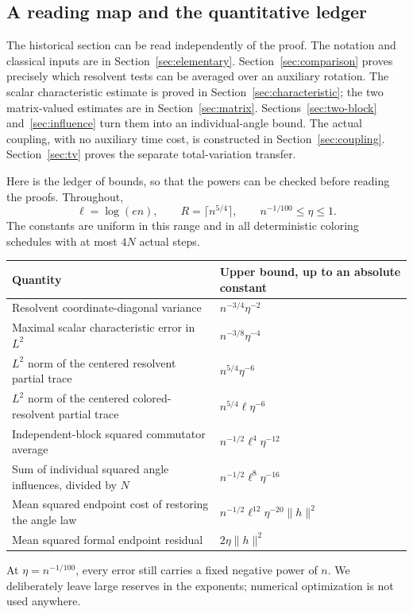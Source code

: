 \documentclass[11pt]{article}
\theoremstyle{definition}\newtheorem{definition}[theorem]{Definition}
\theoremstyle{remark}\newtheorem{remark}[theorem]{Remark}
\begin{document}
\subsection{A reading map and the quantitative ledger}
The historical section can be read independently of the proof. The notation and classical inputs are in Section~\ref{sec:elementary}. Section~\ref{sec:comparison} proves precisely which resolvent tests can be averaged over an auxiliary rotation. The scalar characteristic estimate is proved in Section~\ref{sec:characteristic}; the two matrix-valued estimates are in Section~\ref{sec:matrix}. Sections~\ref{sec:two-block} and~\ref{sec:influence} turn them into an individual-angle bound. The actual coupling, with no auxiliary time cost, is constructed in Section~\ref{sec:coupling}. Section~\ref{sec:tv} proves the separate total-variation transfer.

Here is the ledger of bounds, so that the powers can be checked before reading the proofs. Throughout,
\[
 \ell=\log(en),\qquad R=\lceil n^{5/4}\rceil,\qquad n^{-1/100}\le\eta\le1.
\]
The constants are uniform in this range and in all deterministic coloring schedules with at most $4N$ actual steps.
\begin{center}
\small
\begin{tabular}{p{}p{}}
\toprule
Quantity & Upper bound, up to an absolute constant\\
\midrule
Resolvent coordinate-diagonal variance & $n^{-3/4}\eta^{-2}$\\
Maximal scalar characteristic error in $L^2$ & $n^{-3/8}\eta^{-4}$\\
$L^2$ norm of the centered resolvent partial trace & $n^{5/4}\eta^{-6}$\\
$L^2$ norm of the centered colored-resolvent partial trace & $n^{5/4}\ell\eta^{-6}$\\
Independent-block squared commutator average & $n^{-1/2}\ell^4\eta^{-12}$\\
Sum of individual squared angle influences, divided by $N$ & $n^{-1/2}\ell^8\eta^{-16}$\\
Mean squared endpoint cost of restoring the angle law & $n^{-1/2}\ell^{12}\eta^{-20}\|h\|^2$\\
Mean squared formal endpoint residual & $2\eta\|h\|^2$\\
\bottomrule
\end{tabular}
\end{center}
At $\eta=n^{-1/100}$, every error still carries a fixed negative power of $n$. We deliberately leave large reserves in the exponents; numerical optimization is not used anywhere.
\end{document}
